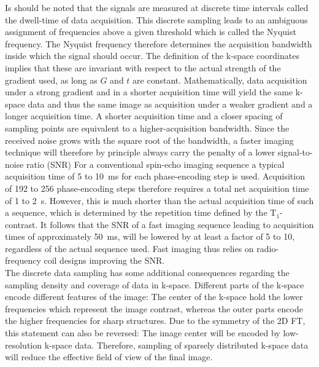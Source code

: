 \documentclass[english,version-2022-01]{uzl-thesis} %
\begin{document}
Is should be noted that the signals are measured 
at discrete time intervals called the dwell-time of data acquisition. This discrete sampling leads to an ambiguous assignment of frequencies above a given threshold which is called the Nyquist frequency. The Nyquist frequency therefore determines the acquisition bandwidth inside which the signal should occur. The definition of the k-space coordinates implies that these are invariant with respect to the actual strength of the gradient used, as long as $G$ and $t$ are constant. Mathematically, data acquisition under a strong gradient and in a shorter acquisition time will yield the same k-space data and thus the same image as acquisition under a weaker gradient and a longer acquisition time. A shorter acquisition time and a closer spacing of sampling points are equivalent to a higher-acquisition bandwidth. Since the received noise grows with the square root of the bandwidth, a faster imaging technique will therefore by principle always carry the penalty of a lower signal-to-noise ratio (SNR)
For a conventional spin-echo imaging sequence
a typical acquisition time of 5 to 10~ms for each phase-encoding step is used. Acquisition of 
192 to 256 phase-encoding steps therefore requires a total net acquisition time of 1 to 2~s. However, this is much shorter than the 
actual
acquisition time of such a sequence, which is determined by the repetition time defined by the $\text{T}_1$-contrast. 
It 
follows that the SNR of a fast imaging sequence leading to acquisition times of approximately 50~ms, will be lowered by at least a factor of 5 to 10, regardless of the actual sequence used. 
Fast imaging thus relies on radio-frequency coil designs improving the SNR.\\
The discrete data sampling has some additional consequences regarding the sampling density and coverage of data in k-space. Different parts of the k-space encode different features of the image: The center of the k-space hold the lower frequencies which represent the image contrast, whereas the outer parts encode the higher frequencies for sharp structures. Due to the symmetry of the 2D FT, this statement can also be reversed: The image center will be encoded by low-resolution k-space data. Therefore, sampling of sparsely distributed k-space data will reduce the effective field of view of the final image. \\
\end{document}

